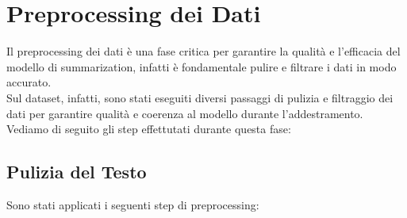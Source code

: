 \section{Preprocessing dei Dati}
Il preprocessing dei dati è una fase critica per garantire la qualità e l'efficacia del modello di summarization, infatti è fondamentale pulire e filtrare i dati in modo accurato.\\
Sul dataset, infatti, sono stati eseguiti diversi passaggi di pulizia e filtraggio dei dati per garantire qualità e coerenza al modello durante l'addestramento.\\
Vediamo di seguito gli step effettutati durante questa fase:
\subsection{Pulizia del Testo}
Sono stati applicati i seguenti step di preprocessing:

